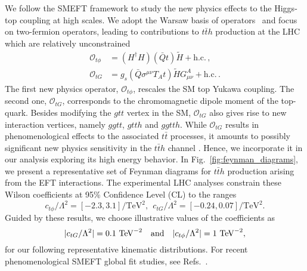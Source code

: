 \documentclass[reprint, aps,prd, preprintnumbers,groupedaddress,nofootinbib]{revtex4-1}
\begin{document}
We follow the SMEFT framework to study the new physics effects to the Higgs-top coupling at high scales. We adopt the Warsaw basis of operators~\cite{Grzadkowski:2010es}  and focus on two-fermion operators, leading to contributions to $t\bar{t}h$ production at the LHC which are relatively unconstrained
\begin{align}
    \mathcal{O}_{t\phi} & =(H^\dagger H)(\bar{Q}t)\tilde{H}+\text{h.c.}\,, \\
    \mathcal{O}_{tG} & =g_s(\bar{Q}\sigma^{\mu\nu}T_A t)\tilde{H}G_{\mu\nu}^A+\text{h.c.}\,.
\end{align}
The first new physics operator, $ \mathcal{O}_{t\phi}$, rescales the SM top Yukawa coupling. The second one, $\mathcal{O}_{tG}$, corresponds to the chromomagnetic dipole moment of the top-quark. Besides modifying the $gtt$ vertex in the SM, $\mathcal{O}_{tG}$ also gives rise to new interaction vertices, namely $ggtt$, $gtth$ and $ggtth$. While  $\mathcal{O}_{tG}$  results in phenomenological effects to the associated $t\bar{t}$ processes, it amounts  to possibly significant new physics sensitivity in the $t\bar{t}h$ channel \cite{Maltoni:2016yxb}. Hence, we incorporate it in our analysis  exploring its high energy behavior. In Fig.~\ref{fig:feynman_diagrams}, we present a representative set of Feynman diagrams for $t\bar{t}h$ production arising from the  EFT interactions. The experimental LHC analyses constrain these Wilson coefficients at 95\% Confidence Level (CL) to the ranges~\cite{ATLAS-CONF-2020-027,CMS:2018jcg}
\begin{equation}
c_{t\phi}/\Lambda^2=[-2.3,3.1]/\text{TeV}^2,
\ \  c_{tG}/\Lambda^2=[-0.24,0.07]/\text{TeV}^2.
\nonumber 
\end{equation}
Guided by these results, we choose  illustrative values of the coefficients as
\begin{equation}
|c_{tG}/\Lambda^2| =   0.1~\text{TeV}^{-2}\quad {\rm and}\quad  |c_{t\phi}/\Lambda^2| =  1~\text{TeV}^{-2}, 
\label{eq:values}
\end{equation}
for our following representative kinematic distributions. For recent phenomenological SMEFT global fit studies, see Refs.~\cite{Ellis:2020unq,Ethier:2021bye}.
\end{document}
